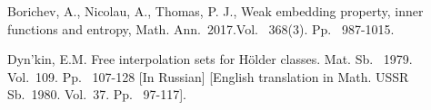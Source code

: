 \documentclass[12pt]{llncs}
\begin{document}


\begin{thebibliography}{9} %


Borichev, A., Nicolau, A.,  Thomas, P. J., Weak embedding property, inner functions and entropy,
 Math. Ann.~2017.Vol. ~368(3). Pp.~ 987-1015.
 
Dyn'kin, E.M. Free interpolation sets for H\"{o}lder classes. Mat. Sb.  ~1979. Vol.~109. Pp.~ 107-128  [In Russian]
[English translation in Math. USSR Sb.~1980. Vol.~37. Pp.~ 97-117].




\end{thebibliography}

\end{document}
